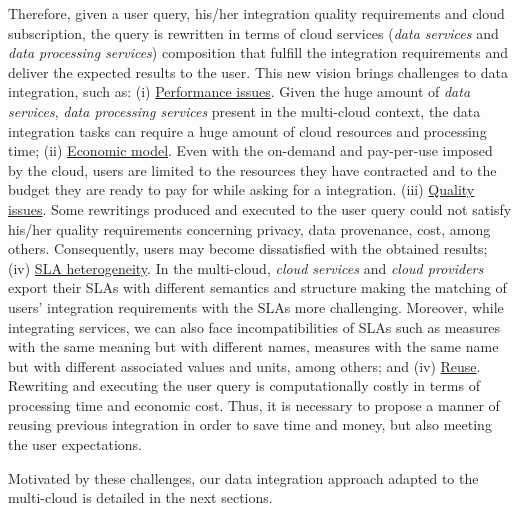 Therefore, given a user query, his/her integration quality requirements and cloud subscription, the query is rewritten in terms of cloud services (\textit{data services} and \textit{data processing services}) composition that fulfill the integration requirements and deliver the expected results to the user. This new vision brings challenges to data integration, such as: (i) \underline{Performance issues}. Given the huge amount of \textit{data services}, \textit{data processing services} present in the multi-cloud context, the data integration tasks can require a huge amount of cloud resources and processing time; (ii) \underline{Economic model}. Even with the on-demand and pay-per-use imposed by the cloud, users are limited to the resources they have contracted and to the budget they are ready to pay for while asking for a integration. %
(iii) \underline{Quality issues}. Some rewritings produced and executed to the user query could not satisfy his/her quality requirements concerning privacy, data provenance, cost, among others. Consequently, users may become dissatisfied with the obtained results; (iv) \underline{SLA heterogeneity}. In the multi-cloud, \textit{cloud services} and \textit{cloud providers} export their SLAs with different semantics and structure making the matching of users' integration requirements with the SLAs more challenging. Moreover, while integrating services, we can also face incompatibilities of SLAs such as measures with the same meaning but with different names, measures with the same name but with different associated values and units, among others; and (iv) \underline{Reuse}. Rewriting and executing the user query is computationally costly in terms of processing time and economic cost. Thus, it is necessary to propose a manner of reusing previous integration in order to save time and money, but also meeting the user expectations.

Motivated by these challenges, our data integration approach adapted to the multi-cloud is detailed in the next sections.


